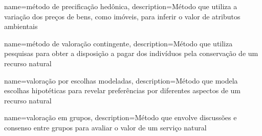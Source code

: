 {
	name=método de precificação hedônica,
	description={Método que utiliza a variação dos preços de bens, como imóveis, para inferir o valor de atributos ambientais}
}

{
	name=método de valoração contingente,
	description={Método que utiliza pesquisas para obter a disposição a pagar dos indivíduos pela conservação de um recurso natural}
}

{
	name=valoração por escolhas modeladas,
	description={Método que modela escolhas hipotéticas para revelar preferências por diferentes aspectos de um recurso natural}
}

{
	name=valoração em grupos,
	description={Método que envolve discussões e consenso entre grupos para avaliar o valor de um serviço natural}
}

